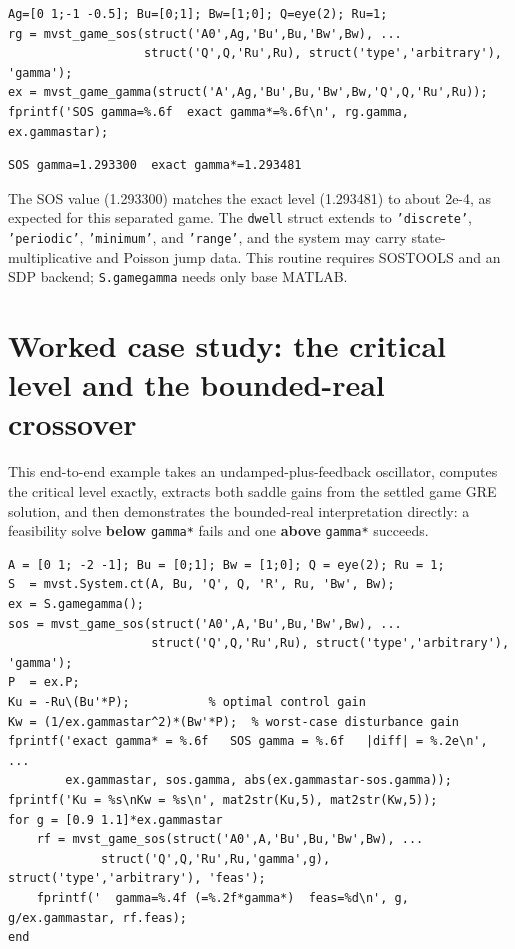\documentclass[11pt,oneside]{report}
\newcommand{\code}[1]{\texttt{#1}}
\begin{document}
\begin{lstlisting}[style=matlabstyle]
Ag=[0 1;-1 -0.5]; Bu=[0;1]; Bw=[1;0]; Q=eye(2); Ru=1;
rg = mvst_game_sos(struct('A0',Ag,'Bu',Bu,'Bw',Bw), ...
                   struct('Q',Q,'Ru',Ru), struct('type','arbitrary'), 'gamma');
ex = mvst_game_gamma(struct('A',Ag,'Bu',Bu,'Bw',Bw,'Q',Q,'Ru',Ru));
fprintf('SOS gamma=%.6f  exact gamma*=%.6f\n', rg.gamma, ex.gammastar);
\end{lstlisting}

\begin{lstlisting}[style=outputstyle]
SOS gamma=1.293300  exact gamma*=1.293481
\end{lstlisting}

The SOS value (1.293300) matches the exact level (1.293481) to about 2e-4, as
expected for this separated game. The \code{dwell} struct extends to \code{'discrete'},
\code{'periodic'}, \code{'minimum'}, and \code{'range'}, and the system may carry
state-multiplicative and Poisson jump data. This routine requires SOSTOOLS and
an SDP backend; \code{S.gamegamma} needs only base MATLAB.

\hypertarget{worked-case-study-the-critical-level-and-the-bounded-real-crossover}{%
\section{Worked case study: the critical level and the bounded-real crossover}\label{worked-case-study-the-critical-level-and-the-bounded-real-crossover}}

This end-to-end example takes an undamped-plus-feedback oscillator, computes the
critical level exactly, extracts both saddle gains from the settled game GRE
solution, and then demonstrates the bounded-real interpretation directly: a feasibility
solve \textbf{below} \code{gamma*} fails and one \textbf{above} \code{gamma*} succeeds.

\begin{lstlisting}[style=matlabstyle]
A = [0 1; -2 -1]; Bu = [0;1]; Bw = [1;0]; Q = eye(2); Ru = 1;
S  = mvst.System.ct(A, Bu, 'Q', Q, 'R', Ru, 'Bw', Bw);
ex = S.gamegamma();
sos = mvst_game_sos(struct('A0',A,'Bu',Bu,'Bw',Bw), ...
                    struct('Q',Q,'Ru',Ru), struct('type','arbitrary'), 'gamma');
P  = ex.P;
Ku = -Ru\(Bu'*P);           % optimal control gain
Kw = (1/ex.gammastar^2)*(Bw'*P);  % worst-case disturbance gain
fprintf('exact gamma* = %.6f   SOS gamma = %.6f   |diff| = %.2e\n', ...
        ex.gammastar, sos.gamma, abs(ex.gammastar-sos.gamma));
fprintf('Ku = %s\nKw = %s\n', mat2str(Ku,5), mat2str(Kw,5));
for g = [0.9 1.1]*ex.gammastar
    rf = mvst_game_sos(struct('A0',A,'Bu',Bu,'Bw',Bw), ...
             struct('Q',Q,'Ru',Ru,'gamma',g), struct('type','arbitrary'), 'feas');
    fprintf('  gamma=%.4f (=%.2f*gamma*)  feas=%d\n', g, g/ex.gammastar, rf.feas);
end
\end{lstlisting}
\end{document}
